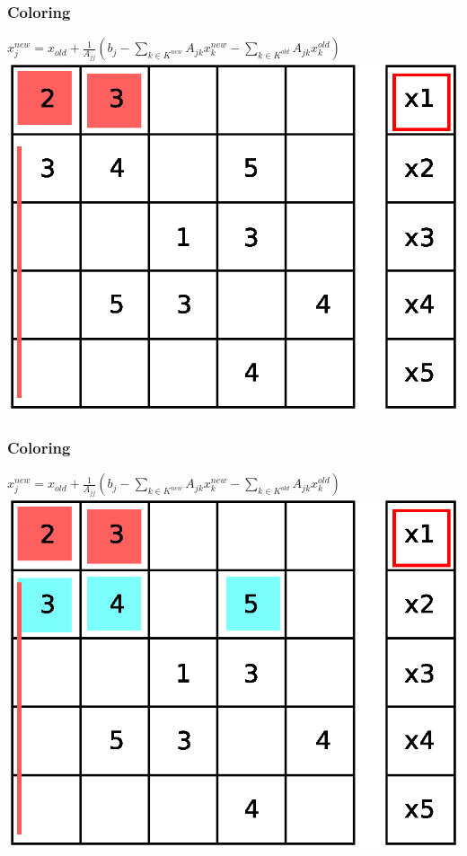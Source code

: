 \documentclass{beamer}
\begin{document}
\begin{frame}
\frametitle{Coloring}
$ x_j^{new} = x_{old} + \frac{1}{A_{jj}} \left(b_{j} - \sum_{k \in K^{new}}A_{jk}
 x_k^{new} - \sum_{k \in K^{old}}A_{jk} x_k^{old}\right)$
\includegraphics[width=0.8\linewidth]{graphic/coloringGS4.eps}
\end{frame}

\begin{frame}
\frametitle{Coloring}
$ x_j^{new} = x_{old} + \frac{1}{A_{jj}} \left(b_{j} - \sum_{k \in K^{new}}A_{jk}
 x_k^{new} - \sum_{k \in K^{old}}A_{jk} x_k^{old}\right)$
\includegraphics[width=0.8\linewidth]{graphic/coloringGS5.eps}
\end{frame}
\end{document}
